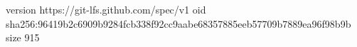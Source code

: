version https://git-lfs.github.com/spec/v1
oid sha256:96419b2c6909b9284fcb338f92cc9aabe68357885eeb57709b7889ea96f98b9b
size 915
